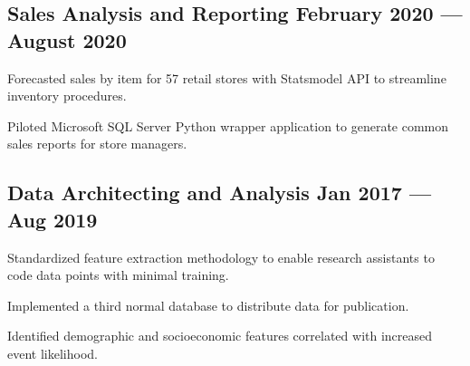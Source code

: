 \documentclass[%
               doublesided,
               paper=a4,
               fontsize=10.5pt
              ]{my-resume}
\begin{document}
{\begin{zitemize}
    \end{zitemize}

    \subsection{{Sales Analysis and Reporting \hfill February 2020 --- August 2020}}
    \footnotesize
    \begin{zitemize}
        \item{Forecasted sales by item for 57 retail stores with Statsmodel API to streamline \\inventory procedures.}
        \item{Piloted Microsoft SQL Server Python wrapper application to generate common sales reports for store managers.} 
    \end{zitemize}

    \subsection{{Data Architecting and Analysis \hfill Jan 2017 --- Aug 2019}}
    \begin{zitemize}
        \footnotesize
        \item{Standardized feature extraction methodology to enable research assistants to code data points with minimal training.}
        \item{Implemented a third normal database to distribute data for publication.}
        \item{Identified demographic and socioeconomic features correlated with increased event likelihood.}
        
    \end{zitemize}

}
\end{document}
